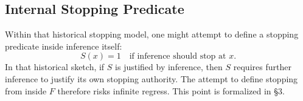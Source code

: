 \subsection{Internal Stopping Predicate}

Within that historical stopping model, one might attempt to define a stopping predicate inside inference itself:
\[
S(x)=1 \quad \text{if inference should stop at } x.
\]
In that historical sketch, if $S$ is justified by inference, then $S$ requires further inference to justify its own stopping authority. The attempt to define stopping from inside $F$ therefore risks infinite regress. This point is formalized in \S{}3.

\bigskip
